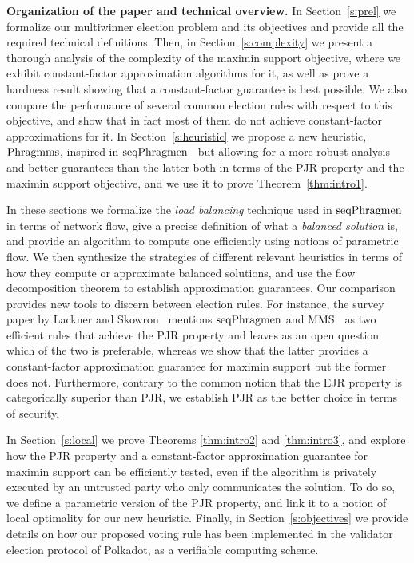 
\vspace{5mm}
\textbf{Organization of the paper and technical overview.}
In Section~\ref{s:prel} we formalize our multiwinner election problem and its objectives and provide all the required technical definitions. Then, in Section~\ref{s:complexity} we present a thorough analysis of the complexity of the maximin support objective, where we exhibit constant-factor approximation algorithms for it, as well as prove a hardness result showing that a constant-factor guarantee is best possible. 
We also compare the performance of several common election rules with respect to this objective, and show that in fact most of them do not achieve constant-factor approximations for it.
In Section~\ref{s:heuristic} we propose a new heuristic, $\operatorname{Phragmms}$, inspired in $\operatorname{seqPhragmen}$~\cite{brill2017phragmen} but allowing for a more robust analysis and better guarantees than the latter both in terms of the PJR property and the maximin support objective, and we use it to prove Theorem~\ref{thm:intro1}. 

In these sections we formalize the \emph{load balancing} technique used in $\operatorname{seqPhragmen}$ in terms of network flow, give a precise definition of what a \emph{balanced solution} is, and provide an algorithm to compute one efficiently using notions of parametric flow. 
We then synthesize the strategies of different relevant heuristics in terms of how they compute or approximate balanced solutions, and use the flow decomposition theorem to establish approximation guarantees. 
Our comparison provides new tools to discern between election rules. For instance, the survey paper by Lackner and Skowron~\cite{lackner2020approval} mentions $\operatorname{seqPhragmen}$ and $\operatorname{MMS}$~\cite{sanchez2016maximin} as two efficient rules that achieve the PJR property and leaves as an open question which of the two is preferable, whereas we show that the latter provides a constant-factor approximation guarantee for maximin support but the former does not. 
Furthermore, contrary to the common notion that the EJR property is categorically superior than PJR, we establish PJR as the better choice in terms of security.

In Section~\ref{s:local} we prove Theorems \ref{thm:intro2} and \ref{thm:intro3}, and explore how the PJR property and a constant-factor approximation guarantee for maximin support can be efficiently tested, even if the algorithm is privately executed by an untrusted party who only communicates the solution. 
To do so, we define a parametric version of the PJR property, and link it to a notion of local optimality for our new heuristic. Finally, in Section~\ref{s:objectives} we provide details on how our proposed voting rule has been implemented in the validator election protocol of Polkadot, as a verifiable computing scheme.

